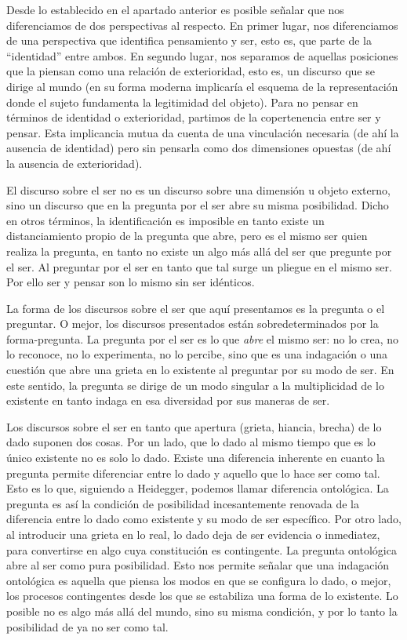 \documentclass{book}
\begin{document}
Desde lo establecido en el apartado anterior es posible señalar que nos
diferenciamos de dos perspectivas al respecto. En primer lugar, nos
diferenciamos de una perspectiva que identifica pensamiento y ser, esto
es, que parte de la \enquote{identidad} entre ambos. En segundo lugar, nos
separamos de aquellas posiciones que la piensan como una relación de
exterioridad, esto es, un discurso que se dirige al mundo (en su forma
moderna implicaría el esquema de la representación donde el sujeto
fundamenta la legitimidad del objeto). Para no pensar en términos de
identidad o exterioridad, partimos de la copertenencia entre ser y
pensar. Esta implicancia mutua da cuenta de una vinculación necesaria
(de ahí la ausencia de identidad) pero sin pensarla como dos dimensiones
opuestas (de ahí la ausencia de exterioridad).

El discurso sobre el ser no es un discurso sobre una dimensión u objeto
externo, sino un discurso que en la pregunta por el ser abre su misma
posibilidad. Dicho en otros términos, la identificación es imposible en
tanto existe un distanciamiento propio de la pregunta que abre, pero es
el mismo ser quien realiza la pregunta, en tanto no existe un algo más
allá del ser que pregunte por el ser. Al preguntar por el ser en tanto
que tal surge un pliegue en el mismo ser. Por ello ser y pensar son lo
mismo sin ser idénticos.

La forma de los discursos sobre el ser que aquí presentamos es la
pregunta o el preguntar. O mejor, los discursos presentados están
sobredeterminados por la forma-pregunta. La pregunta por el ser es lo
que \emph{abre} el mismo ser: no lo crea, no lo reconoce, no lo
experimenta, no lo percibe, sino que es una indagación o una cuestión
que abre una grieta en lo existente al preguntar por su modo de ser. En
este sentido, la pregunta se dirige de un modo singular a la
multiplicidad de lo existente en tanto indaga en esa diversidad por sus
maneras de ser.

Los discursos sobre el ser en tanto que apertura (grieta, hiancia,
brecha) de lo dado suponen dos cosas. Por un lado, que lo dado al mismo
tiempo que es lo único existente no es solo lo dado. Existe una
diferencia inherente en cuanto la pregunta permite diferenciar entre lo
dado y aquello que lo hace ser como tal. Esto es lo que, siguiendo a
Heidegger, podemos llamar diferencia ontológica. La pregunta es así la
condición de posibilidad incesantemente renovada de la diferencia entre
lo dado como existente y su modo de ser específico. Por otro lado, al
introducir una grieta en lo real, lo dado deja de ser evidencia o
inmediatez, para convertirse en algo cuya constitución es contingente.
La pregunta ontológica abre al ser como pura posibilidad. Esto nos
permite señalar que una indagación ontológica es aquella que piensa los
modos en que se configura lo dado, o mejor, los procesos contingentes
desde los que se estabiliza una forma de lo existente. Lo posible no es
algo más allá del mundo, sino su misma condición, y por lo tanto la
posibilidad de ya no ser como tal.
\end{document}
